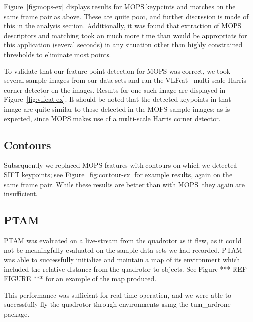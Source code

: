\documentclass{acmsiggraph}
\begin{document}
Figure~\ref{fig:mops-ex} displays results for MOPS keypoints and matches on the same frame pair as above. These are quite poor, and further discussion is made of this in the analysis section. Additionally, it was found that extraction of MOPS descriptors and matching took an much more time than would be appropriate for this application (several seconds) in any situation other than highly constrained thresholds to eliminate most points.

To validate that our feature point detection for MOPS was correct, we took several sample images from our data sets and ran the VLFeat~\cite{vlfeat} multi-scale Harris corner detector on the images. Results for one such image are displayed in Figure~\ref{fig:vlfeat-ex}. It should be noted that the detected keypoints in that image are quite similar to those detected in the MOPS sample images; as is expected, since MOPS makes use of a multi-scale Harris corner detector.

\subsection{Contours}
Subsequently we replaced MOPS features with contours on which we detected SIFT keypoints; see Figure~\ref{fig:contour-ex} for example results, again on the same frame pair. While these results are better than with MOPS, they again are insufficient.

\subsection{PTAM}
PTAM was evaluated on a live-stream from the quadrotor as it flew, as it could not be meaningfully evaluated on the sample data sets we had recorded. PTAM was able to successfully initialize and maintain a map of its environment which included the relative distance from the quadrotor to objects. See Figure *** REF FIGURE *** for an example of the map produced.

This performance was sufficient for real-time operation, and we were able to successfully fly the quadrotor through environments using the tum\_ardrone package.
\end{document}
